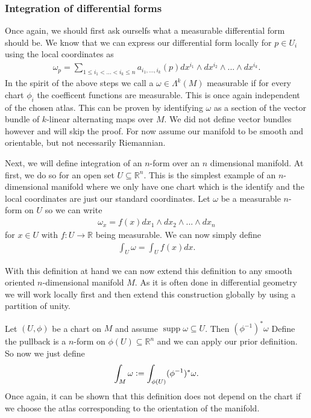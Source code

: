 \documentclass[12pt,a4paper]{article}
\numberwithin{equation}{subsection}
\numberwithin{lemma}{subsection}
\theoremstyle{definition}
\DeclareMathOperator{\supp}{supp}
\newcommand{\real}{\mathbb{R}}
\begin{document}
\subsubsection{Integration of differential forms}\label{sec:integration_differential_forms}

Once again, we should first ask ourselfs what a measurable differential form 
should be. We know that we can express our differential form locally 
for $p \in U_i$ using the local coordinates as 
\begin{align*}
    \omega_p = \sum\limits_{1\leq i_1 < ... < i_k \leq n} 
        a_{i_1,...,i_k}(p) dx^{i_1} \wedge dx^{i_2} \wedge ... \wedge dx^{i_k}.
\end{align*}
In the spirit of the above steps we call a $\omega \in \Lambda^k (M)$
measurable if for every chart $\phi_i$ the coefficent functions 
are measurable. This is once again independent of the chosen atlas. 
This can be proven by identifying $\omega$ as a section of the vector bundle 
of $k$-linear alternating maps over $M$. We did not define vector bundles
however and will skip the proof.
For now assume our manifold to be smooth and orientable, but not necessarily
Riemannian.

Next, we will define integration of an $n$-form over an $n$ dimensional 
manifold. At first, we do so for an open set $U \subseteq \real^n$.
This is the simplest example of an $n$-dimensional manifold where 
we only have one chart which is the identify and the local coordinates are 
just our standard coordinates. Let $\omega$ be a measurable 
$n$-form on $U$ so we can 
write 
\begin{align*}
    \omega_x = f(x) dx_1 \wedge dx_2 \wedge ... \wedge dx_n
\end{align*}
for $x \in U$ with $f:U \rightarrow \real$ being measurable. 
We can now simply define 
\begin{align*}
    \int_U \omega = \int_U f(x) dx.
\end{align*}

With this definition at hand we can now extend this definition to 
any smooth oriented $n$-dimensional manifold $M$. As it is often done in 
differential geometry we will work locally first and then extend this 
construction globally by using a partition of unity.

Let $(U,\phi)$ be a chart on $M$ and assume $\supp \omega \subseteq U$. 
Then $(\phi^{-1})^* \omega$ {\color{red} Define the pullback}
is a $n$-form on $\phi(U) \subseteq \real^n$ and 
we can apply our prior definition. So now we just define 
\begin{align*}
    \int_M \omega \vcentcolon= \int_{\phi(U)} (\phi^{-1})^* \omega.
\end{align*}
Once again, it can be shown that this definition does not depend on the chart if 
we choose the atlas corresponding to the orientation of the manifold. 
\end{document}
